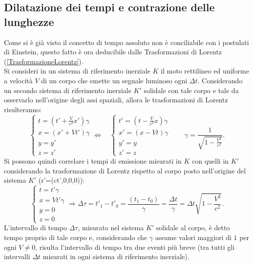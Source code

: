 \subsection{Dilatazione dei tempi e contrazione delle lunghezze}\label{sec:ContrazioneDilatazione}
Come si è già visto il concetto di tempo assoluto non è conciliabile con i postulati di Einstein, questo fatto è ora deducibile dalle Trasformazioni di Lorentz (\ref{TrasformazioneLorentz}).\\
Si consideri in un sistema di riferimento inerziale $K$ il moto rettilineo ed uniforme a velocità $V$ di un corpo che emette un segnale luminoso ogni $\Delta t$. Considerando un secondo sistema di riferimento inerziale $K'$ solidale con tale corpo e tale da osservarlo nell'origine degli assi spaziali, allora le trasformazioni di Lorentz risulteranno:
\begin{equation*}
    \begin{cases}
        t=(t'+\frac{V}{c^2}x')\gamma\\
        x=(x'+Vt')\gamma\\
        y=y'\\
        z=z'
    \end{cases}
    \Longleftrightarrow \quad
    \begin{cases}
        t'=(t-\frac{V}{c^2}x)\gamma\\
        x'=(x-Vt)\gamma\\
        y'=y\\
        z'=z
    \end{cases}
    \qquad \gamma=\frac{1}{\sqrt{1-\frac{V^2}{c^2}}}.
\end{equation*}
Si possono quindi correlare i tempi di emissione misurati in $K$ con quelli in $K'$ considerando la trasformazione di Lorentz rispetto al corpo posto nell'origine del sistema $K'$ (r'=(ct',0,0,0)): 
\begin{equation}
    \begin{cases}
        t=t'\gamma\\
        x=Vt'\gamma\\
        y=0\\
        z=0
    \end{cases}
    \Rightarrow \Delta \tau=t'_1-t'_0=\frac{(t_1-t_0)}{\gamma}=\frac{\Delta t}{\gamma}=\Delta t \sqrt{1-\frac{V^2}{c^2}}.
    \label{dilatazioneTempi}
\end{equation}
L'intervallo di tempo $\Delta \tau$, misurato nel sistema $K'$ solidale al corpo, è detto tempo proprio di tale corpo e, considerando che $\gamma$ assume valori maggiori di $1$ per ogni $V\neq 0$, risulta l'intervallo di tempo tra due eventi più breve (tra tutti gli intervalli $\Delta t$ misurati in ogni sistema di riferimento inerziale).\\

